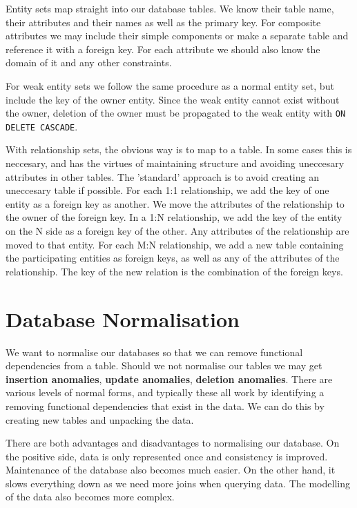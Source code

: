 \documentclass{article}
\begin{document}
	\par 
	Entity sets map straight into our database tables. We know their table name, their attributes and their names as well as the primary key. For composite attributes we may include their simple components or make a separate table and reference it with a foreign key. For each attribute we should also know the domain of it and any other constraints. 
	
	\par For weak entity sets we follow the same procedure as a normal entity set, but include the key of the owner entity. Since the weak entity cannot exist without the owner, deletion of the owner must be propagated to the weak entity with \texttt{ON DELETE CASCADE}.
	
	\par With relationship sets, the obvious way is to map to a table. In some cases this is neccesary, and has the virtues of maintaining structure and avoiding uneccesary attributes in other tables. The 'standard' approach is to avoid creating an uneccesary table if possible. For each 1:1 relationship, we add the key of one entity as a foreign key as another. We move the attributes of the relationship to the owner of the foreign key. In a 1:N relationship, we add the key of the entity on the N side as a foreign key of the other. Any attributes of the relationship are moved to that entity. For each M:N relationship, we add a new table containing the participating entities as foreign keys, as well as any of the attributes of the relationship. The key of the new relation is the combination of the foreign keys.
	
	\section{Database Normalisation}
	We want to normalise our databases so that we can remove functional dependencies from a table. Should we not normalise our tables we may get \textbf{insertion anomalies}, \textbf{update anomalies}, \textbf{deletion anomalies}. There are various levels of normal forms, and typically these all work by identifying a removing functional dependencies that exist in the data. We can do this by creating new tables and unpacking the data.
	
	\par 
	There are both advantages and disadvantages to normalising our database. On the positive side, data is only represented once and consistency is improved. Maintenance of the database also becomes much easier. On the other hand, it slows everything down as we need more joins when querying data. The modelling of the data also becomes more complex.
	
\end{document}
